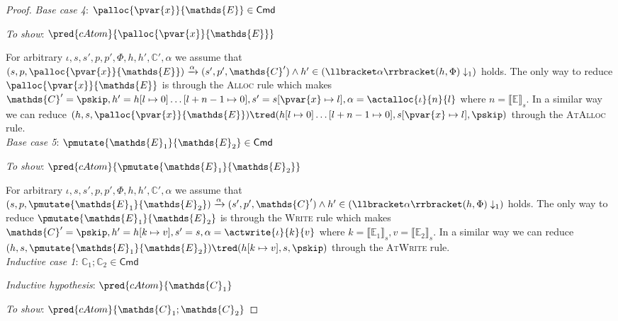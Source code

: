 {\begin{proof}
\textit{Base case 4}: $\palloc{\pvar{x}}{\mathds{E}} \in \mathsf{Cmd}$

\textit{To show}: $\pred{cAtom}{\palloc{\pvar{x}}{\mathds{E}}}$

For arbitrary $\iota, s, s', p, p', \Phi, h, h', \mathds{C}', \alpha$ we assume that $(s, p, \palloc{\pvar{x}}{\mathds{E}}) \xrightarrow{\alpha} (s', p', \mathds{C}') \land h' \in \left( \llbracket \alpha \rrbracket(h, \Phi) \downarrow_1 \right)$ holds. The only way to reduce $\palloc{\pvar{x}}{\mathds{E}}$ is through the \textsc{Alloc} rule which makes $\mathds{C}' = \pskip, h' = h[l \mapsto 0]\ldots[l + n - 1 \mapsto 0], s' = s[\pvar{x} \mapsto l], \alpha = \actalloc{\iota}{n}{l}$ where $n = \llbracket \mathds{E} \rrbracket_s$. In a similar way we can reduce $(h, s, \palloc{\pvar{x}}{\mathds{E}}) \tred (h[l \mapsto 0]\ldots[l + n - 1 \mapsto 0], s[\pvar{x} \mapsto l], \pskip)$ through the \textsc{AtAlloc} rule. \\

\textit{Base case 5}: $\pmutate{\mathds{E}_1}{\mathds{E}_2} \in \mathsf{Cmd}$

\textit{To show}: $\pred{cAtom}{\pmutate{\mathds{E}_1}{\mathds{E}_2}}$

For arbitrary $\iota, s, s', p, p', \Phi, h, h', \mathds{C}', \alpha$ we assume that $(s, p, \pmutate{\mathds{E}_1}{\mathds{E}_2}) \xrightarrow{\alpha} (s', p', \mathds{C}') \land h' \in \left( \llbracket \alpha \rrbracket(h, \Phi) \downarrow_1 \right)$ holds. The only way to reduce $\pmutate{\mathds{E}_1}{\mathds{E}_2}$ is through the \textsc{Write} rule which makes $\mathds{C}' = \pskip, h' = h[k \mapsto v], s' = s, \alpha = \actwrite{\iota}{k}{v}$ where $k = \llbracket \mathds{E}_1 \rrbracket_s, v = \llbracket \mathds{E}_2 \rrbracket_s$.  In a similar way we can reduce $(h, s, \pmutate{\mathds{E}_1}{\mathds{E}_2}) \tred (h[k \mapsto v], s, \pskip)$ through the \textsc{AtWrite} rule. \\

\textit{Inductive case 1}: $\mathds{C}_1 ; \mathds{C}_2 \in \mathsf{Cmd}$

\textit{Inductive hypothesis}: $\pred{cAtom}{\mathds{C}_1}$

\textit{To show}: $\pred{cAtom}{\mathds{C}_1 ; \mathds{C}_2}$


\end{proof}}
